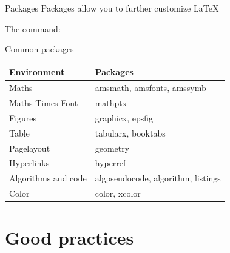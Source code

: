 \documentclass[10pt,times]{beamer}
\begin{document}
\begin{frame}{Packages}
Packages allow you to further customize \LaTeX
\begin{block}{The command:}
\end{block}

\begin{block}{Common packages}
\begin{tabularx}{0.95\textwidth}{lX}
\toprule
Environment & Packages \\ \midrule
Maths & amsmath, amsfonts, amssymb \\ 
Maths Times Font & {mathptx} \\
Figures & graphicx, epsfig \\
Table & tabularx, booktabs \\
Pagelayout & geometry \\
Hyperlinks & hyperref \\
Algorithms and code & algpseudocode, algorithm, listings \\
Color & color, xcolor \\
\bottomrule
\end{tabularx}
\end{block}
\end{frame}


\section{Good practices}
\end{document}
